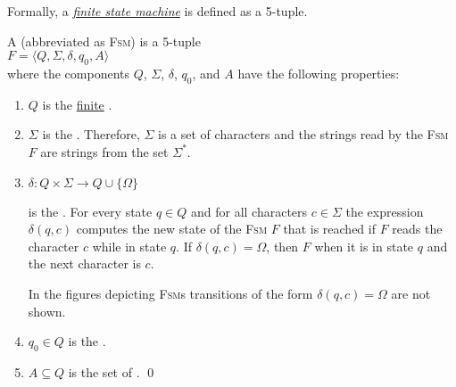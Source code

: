 \noindent
Formally, a \href{http://en.wikipedia.org/wiki/Finite-state_machine}{\emph{finite state machine}} 
is defined as a 5-tuple.
\begin{Definition}
A  (abbreviated as \textsc{Fsm}) is a 5-tuple 
\\[0.2cm]
\hspace*{1.3cm}
$F = \langle Q, \Sigma, \delta, q_0, A\rangle$
\\[0.2cm]
where the components $Q$, $\Sigma$, $\delta$, $q_0$, and $A$ have the following properties:
\begin{enumerate}
\item $Q$ is the \underline{finite} .
\item $\Sigma$ is the \index{$\Sigma$}.  Therefore, $\Sigma$ is a
      set of characters and 
      the strings read by the \textsc{Fsm} $F$ are strings from the set $\Sigma^*$.
\item $\delta: Q \times \Sigma \rightarrow Q \cup \{ \Omega \}$

      is the  .  For every state $q\in Q$ and for all
      characters $c \in \Sigma$ the expression $\delta(q,c)$ computes the new state of the \textsc{Fsm} $F$
      that is reached if $F$ reads the character $c$ while in state $q$.
      If $\delta(q,c) = \Omega$, then $F$  when it is in state $q$ and the next character
      is $c$. 

      In the figures depicting \textsc{Fsm}s transitions of the form $\delta(q, c) = \Omega$ 
      are not shown.
\item $q_0 \in Q$ is the . 
\item $A \subseteq Q$ is the set of . 
      \qed
\end{enumerate}
\end{Definition}


